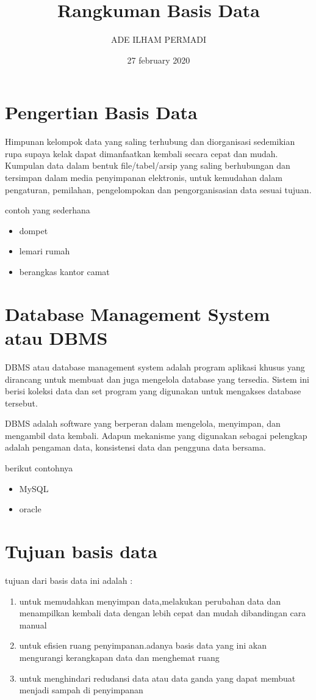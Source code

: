 \documentclass[12pt]{article}
\title{Rangkuman Basis Data}
\author{ADE ILHAM PERMADI}
\date{27 february 2020}
\begin{document}
\maketitle


\section{Pengertian Basis Data}
 
    
    Himpunan kelompok data yang saling terhubung dan diorganisasi sedemikian rupa supaya kelak dapat dimanfaatkan kembali secara cepat dan mudah.
    Kumpulan data dalam bentuk file/tabel/arsip yang saling berhubungan dan tersimpan dalam media penyimpanan elektronis, untuk kemudahan dalam pengaturan, pemilahan,  pengelompokan dan pengorganisasian data sesuai tujuan.
    
    
    contoh yang sederhana
  

\begin{itemize}
\item dompet
\item lemari rumah
\item berangkas kantor camat
\end{itemize}
  
\section{Database Management System atau DBMS}

DBMS atau database management system adalah program aplikasi khusus yang dirancang untuk membuat dan juga mengelola database yang tersedia. Sistem ini berisi koleksi data dan set program yang digunakan untuk mengakses database tersebut.

DBMS adalah software yang berperan dalam mengelola, menyimpan, dan mengambil data kembali. Adapun mekanisme yang digunakan sebagai pelengkap adalah pengaman data, konsistensi data dan pengguna data bersama.

berikut contohnya

\begin{itemize}
\item MySQL
\item oracle
\end{itemize}

  
\section{Tujuan basis data}
 tujuan dari basis data ini adalah :
\begin{enumerate}
\item untuk memudahkan menyimpan data,melakukan perubahan data dan menampilkan kembali data dengan lebih cepat dan mudah dibandingan cara manual

\item untuk efisien ruang penyimpanan.adanya basis data yang ini akan mengurangi kerangkapan data dan menghemat ruang

\item untuk menghindari redudansi data atau data ganda yang dapat membuat menjadi sampah di penyimpanan 
\end{enumerate}
\end{document}

